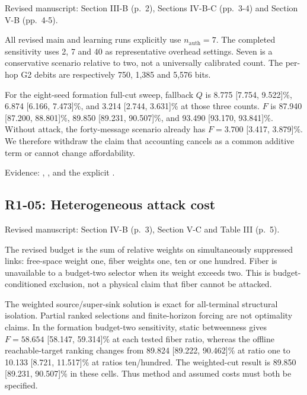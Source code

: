 \documentclass[a4paper,11pt]{article}
\begin{document}
Revised manuscript: Section III-B (p.~2), Sections IV-B-C (pp.~3-4) and Section V-B (pp.~4-5).

All revised main and learning runs explicitly use \(n_{\mathrm{auth}}=7\). The completed sensitivity uses 2, 7 and 40 as representative overhead settings. Seven is a conservative scenario relative to two, not a universally calibrated count. The per-hop G2 debits are respectively 750, 1,385 and 5,576 bits.

For the eight-seed formation full-cut sweep, fallback \(Q\) is 8.775 {[}7.754, 9.522{]}\%, 6.874 {[}6.166, 7.473{]}\%, and 3.214 {[}2.744, 3.631{]}\% at those three counts. \(F\) is 87.940 {[}87.200, 88.801{]}\%, 89.850 {[}89.231, 90.507{]}\%, and 93.490 {[}93.170, 93.841{]}\%. Without attack, the forty-message scenario already has \(F=3.700\) {[}3.417, 3.879{]}\%. We therefore withdraw the claim that accounting cancels as a common additive term or cannot change affordability.

Evidence: , , and the explicit .

\subsection{R1-05: Heterogeneous attack cost}\label{r1-05-heterogeneous-attack-cost}

Revised manuscript: Section IV-B (p.~3), Section V-C and Table III (p.~5).

The revised budget is the sum of relative weights on simultaneously suppressed links: free-space weight one, fiber weights one, ten or one hundred. Fiber is unavailable to a budget-two selector when its weight exceeds two. This is budget-conditioned exclusion, not a physical claim that fiber cannot be attacked.

The weighted source/super-sink solution is exact for all-terminal structural isolation. Partial ranked selections and finite-horizon forcing are not optimality claims. In the formation budget-two sensitivity, static betweenness gives \(F=58.654\) {[}58.147, 59.314{]}\% at each tested fiber ratio, whereas the offline reachable-target ranking changes from 89.824 {[}89.222, 90.462{]}\% at ratio one to 10.133 {[}8.721, 11.517{]}\% at ratios ten/hundred. The weighted-cut result is 89.850 {[}89.231, 90.507{]}\% in these cells. Thus method and assumed costs must both be specified.
\end{document}
